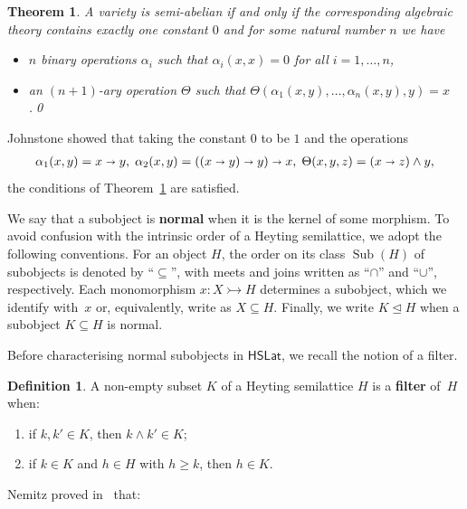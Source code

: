 \documentclass[reqno,a4paper]{amsart}
\newtheorem{theorem}[lemma]{Theorem}
\theoremstyle{remark}
\theoremstyle{definition}
\newtheorem{definition}[lemma]{Definition}
\newcommand{\defn}{\textbf}
\newcommand{\noproof}{\hfill \qed}
\DeclareMathOperator{\Sub}{Sub}
\newcommand{\oleq}{\subseteq} %
\newcommand{\normal}{\trianglelefteq} %
\newcommand{\omeet}{\cap} %
\newcommand{\ojoin}{\cup}  %
\newcommand{\iimplies}{\shortrightarrow}
\newcommand{\HSLat}{\ensuremath{\mathsf{HSLat}}}
\renewcommand{\geq}{\geqslant}
\begin{document}
\begin{theorem}\label{BouJa Charact}
	A variety is semi-abelian if and only if the corresponding algebraic theory contains exactly one constant \(0\) and for some natural number \(n\) we have
	\begin{itemize}
		\item \(n\) binary operations \(\alpha_i\) such that \(\alpha_i(x,x) =0\) for all \(i=1, \dots , n\),
		\item an \((n+1)\)-ary operation \(\Theta\) such that \(\Theta(\alpha_1(x,y), \dots , \alpha_n(x,y),y)= x\).\noproof
	\end{itemize}
\end{theorem}

Johnstone showed that taking the constant \(0\) to be \(1\) and the operations
\begin{align}\label{protomodular terms for HSL}
	\alpha_1(x,y)= x \iimplies y, \;
	\alpha_2(x,y)= ((x\iimplies y)\iimplies y)\iimplies x, \;
	\Theta(x,y,z) = (x \iimplies z) \wedge y,
\end{align}
the conditions of Theorem~\ref{BouJa Charact} are satisfied.

We say that a subobject is \defn{normal} when it is the kernel of some morphism.
To avoid confusion with the intrinsic order of a Heyting semilattice, we adopt the following conventions.
For an object \(H\), the order on its class \(\Sub(H)\) of subobjects is denoted by ``\(\oleq\)'',
with meets and joins written as ``\(\omeet\)'' and ``\(\ojoin\)'', respectively.
Each monomorphism \(x \colon X \rightarrowtail H\) determines a subobject, which we identify with~\(x\) or, equivalently, write as \(X \oleq H\).
Finally, we write \(K \normal H\) when a subobject \(K \oleq H \) is normal.


Before characterising normal subobjects in \(\HSLat\), we recall the notion of a filter.

\begin{definition}
	A non-empty subset \(K\) of a Heyting semilattice \(H\) is a \defn{filter} of~\(H\) when:
	\begin{enumerate}
		\item if \(k, k' \in K\), then \(k \wedge k' \in K\);
		\item if \(k \in K\) and \(h \in H\) with \(h \geq k\), then \(h \in K\).
	\end{enumerate}
\end{definition}

Nemitz proved in~\cite{Nemitz} that:
\end{document}
